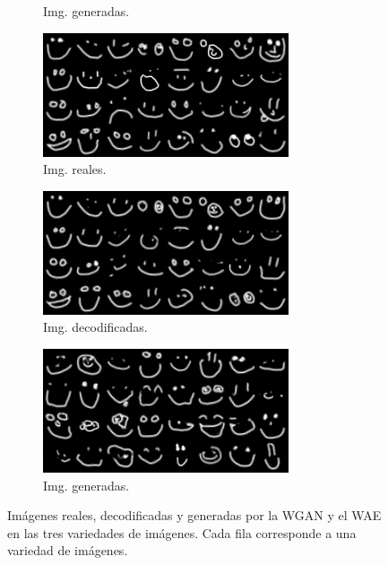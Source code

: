 \begin{figure}[H]
\begin{subfigure}[b]{0.32\textwidth}
        \caption{Img. generadas.}
        \label{fig:gen2}
    \end{subfigure}
    \begin{subfigure}[b]{0.32\textwidth}
        \centering
        \includegraphics[width=\textwidth]{img/wgan-wae/real3.png}
        \caption{Img. reales.}
        \label{fig:real3}
    \end{subfigure}
    \hfill
    \begin{subfigure}[b]{0.32\textwidth}
        \centering
        \includegraphics[width=\textwidth]{img/wgan-wae/decoded3.png}
        \caption{Img. decodificadas.}
        \label{fig:decoded3}
    \end{subfigure}
    \hfill
    \begin{subfigure}[b]{0.32\textwidth}
        \centering
        \includegraphics[width=\textwidth]{img/wgan-wae/gen3.png}
        \caption{Img. generadas.}
        \label{fig:gen3}
    \end{subfigure}
    \caption{Imágenes reales, decodificadas y generadas por la WGAN y el WAE en las tres variedades de imágenes. Cada fila corresponde a una variedad de imágenes.}
    \label{fig:generacion-imagenes}
\end{figure}



